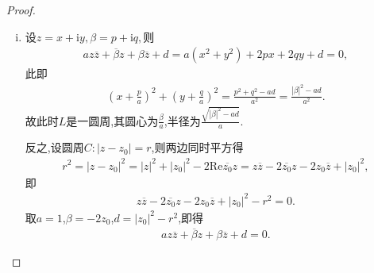 \documentclass[../../main.tex]{subfiles}%
\begin{document}
\begin{proof}
\begin{enumerate}[(1)]
\begin{enumerate}[(i)]
\item 设$z=x+\mathrm{i}y,\beta =p+\mathrm{i}q,$则
\begin{align*}
az\overline{z}+\overline{\beta }z+\beta \overline{z}+d=a\left( x^2+y^2 \right) +2px+2qy+d=0,
\end{align*}
此即
\begin{align*}
\left( x+\frac{p}{a} \right) ^2+\left( y+\frac{q}{a} \right) ^2=\frac{p^2+q^2-ad}{a^2}=\frac{\left| \beta \right|^2-ad}{a^2}.
\end{align*}
故此时$L$是一圆周,其圆心为$\frac{\beta}{a}$,半径为$\frac{\sqrt{\left| \beta \right|^2-ad}}{a}.$

反之,设圆周$C:\left| z-z_0 \right|=r$,则两边同时平方得
\begin{align*}
r^2=\left| z-z_0 \right|^2=\left| z \right|^2+\left| z_0 \right|^2-2\mathrm{Re}\overline{z_0}z=z\overline{z}-2\overline{z_0}z-2z_0\overline{z}+\left| z_0 \right|^2,
\end{align*}
即
\begin{align*}
z\overline{z}-2\overline{z_0}z-2z_0\overline{z}+\left| z_0 \right|^2-r^2=0.
\end{align*}
取$a=1$,$\beta =-2z_0$,$d=\left| z_0 \right|^2-r^2$,即得
\begin{align*}
az\overline{z}+\overline{\beta }z+\beta \overline{z}+d=0.
\end{align*}
\end{enumerate}


\end{enumerate}
\end{proof}
\end{document}
